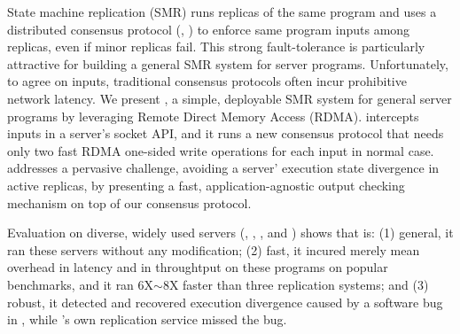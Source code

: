 

State machine replication (SMR) runs replicas of the same program and 
uses a distributed consensus protocol (\eg, \paxos) to enforce same program 
inputs among replicas, even if minor replicas fail. This strong 
fault-tolerance is particularly attractive for building a general SMR system 
for server programs. Unfortunately, to agree on inputs, traditional consensus 
protocols often incur prohibitive network latency. We present \xxx, a simple, 
deployable SMR system for general server programs by leveraging Remote Direct 
Memory Access (RDMA). \xxx intercepts inputs in a server's socket API, and it 
runs a new \paxos consensus protocol that needs only two fast RDMA one-sided 
write operations for each input in normal case. \xxx addresses a pervasive 
challenge, avoiding a server' execution state divergence in active replicas, by 
presenting a fast, application-agnostic output checking mechanism on top of our 
consensus protocol.

Evaluation on \npopularprog diverse, widely used servers (\eg, \memcached, 
\mysql, and \clamav) shows that \xxx is: (1) general, it ran these servers 
without any modification; (2) fast, it incured merely \latencyoverhead mean 
overhead in latency and \tputoverhead in throughtput on these programs on 
popular benchmarks, and it ran 6X$\sim$8X faster than three replication 
systems; and (3) robust, it detected and recovered execution divergence caused 
by a software bug in \redis, while \redis's own replication service missed the 
bug.


